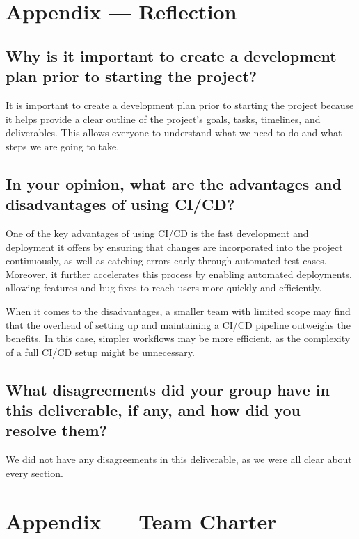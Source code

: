 \documentclass{article}
\begin{document}
\newpage{}

\section*{Appendix --- Reflection}




\subsection*{Why is it important to create a development plan prior to starting the project?}
It is important to create a development plan prior to starting the project because it helps provide a clear outline of the project's goals, tasks, timelines, and deliverables. This allows everyone to understand what we need to do and what steps we are going to take.

\subsection*{In your opinion, what are the advantages and disadvantages of using CI/CD?}
One of the key advantages of using CI/CD is the fast development and deployment it offers by ensuring that changes are incorporated into the project continuously, as well as catching errors early through automated test cases. Moreover, it further accelerates this process by enabling automated deployments, allowing features and bug fixes to reach users more quickly and efficiently.

When it comes to the disadvantages, a smaller team with limited scope may find that the overhead of setting up and maintaining a CI/CD pipeline outweighs the benefits. In this case, simpler workflows may be more efficient, as the complexity of a full CI/CD setup might be unnecessary.

\subsection*{What disagreements did your group have in this deliverable, if any, and how did you resolve them?}
We did not have any disagreements in this deliverable, as we were all clear about every section.


\newpage{}

\section*{Appendix --- Team Charter}
\end{document}
